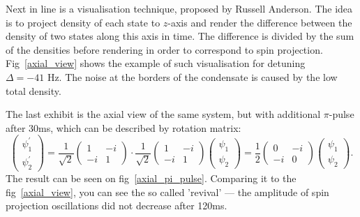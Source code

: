 \documentclass[12pt,notitlepage]{report}
\begin{document}
Next in line is a visualisation technique, proposed by Russell Anderson.
The idea is to project density of each state to $z$-axis
and render the difference between the density of two states along this axis in time.
The difference is divided by the sum of the densities before rendering in order to correspond to spin projection.
Fig~\ref{axial_view} shows the example of such visualisation for detuning $\Delta = -41 \textrm{ Hz}$.
The noise at the borders of the condensate is caused by the low total density.

The last exhibit is the axial view of the same system, but with additional $\pi$-pulse after 30ms,
which can be described by rotation matrix:
\[
\begin{pmatrix}
	\psi^\prime_1 \\	\psi^\prime_2
\end{pmatrix} =
\frac{1}{\sqrt{2}} \begin{pmatrix}
	1 & -i \\ -i & 1
\end{pmatrix} \cdot
\frac{1}{\sqrt{2}} \begin{pmatrix}
	1 & -i \\ -i & 1
\end{pmatrix}
\begin{pmatrix}
	\psi_1 \\ \psi_2
\end{pmatrix} =
\frac{1}{2} \begin{pmatrix}
	0 & -i \\ -i & 0
\end{pmatrix}
\begin{pmatrix}
	\psi_1 \\ \psi_2
\end{pmatrix}.
\]
The result can be seen on fig~\ref{axial_pi_pulse}.
Comparing it to the fig~\ref{axial_view}, you can see the so called 'revival' ---
the amplitude of spin projection oscillations did not decrease after 120ms.



\end{document}
